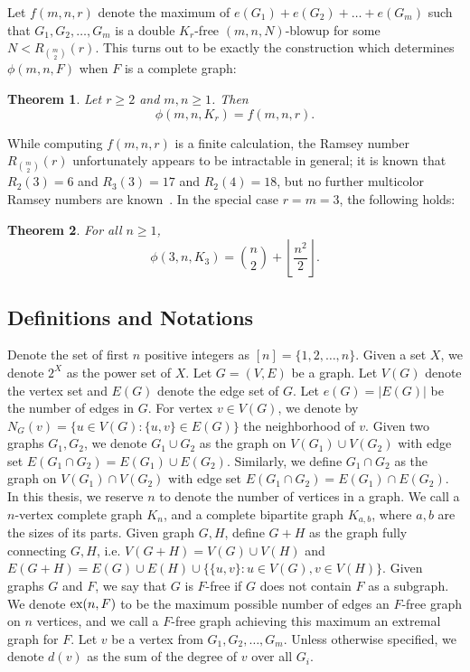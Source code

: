 \documentclass[12pt]{article}
\newtheorem{theorem}{Theorem}
\newcommand*{\ex}{\textnormal{ex}}
\begin{document}
Let $f(m, n, r)$ denote the maximum of $e(G_1) + e(G_2) + \dots + e(G_m)$ such that $G_1, G_2, \dots, G_m$ is a double $K_r$-free $(m, n, N)$-blowup for some $N < R_{\binom{m}{2}}(r)$. This turns out to be exactly the construction which determines $\phi(m, n, F)$ when $F$ is a complete graph: 

\begin{theorem}\label{thm:blowup}
Let $r \geq 2$ and $m,n \geq 1$. Then 
\[ 
  \phi(m, n, K_r) = f(m, n, r).
\]
\end{theorem}

While computing $f(m, n, r)$ is a finite calculation, the Ramsey number $R_{\binom{m}{2}}(r)$ unfortunately appears to be intractable in general; it is known that $R_2(3) = 6$ and $R_3(3) = 17$ and $R_2(4) = 18$, but no further multicolor Ramsey numbers are known~\cite{ConlonFerber2021,Lefmann1987}. In the special case $r = m = 3$, the following holds: 

\begin{theorem}\label{thm:triangles}
  For all $n \geq 1$,
  \[
    \phi(3, n, K_3) = \binom{n}{2} + \left\lfloor \frac{n^2}{2} \right\rfloor.
  \]
\end{theorem}

\subsection{Definitions and Notations}

Denote the set of first $n$ positive integers as $[n] = \{1, 2, \ldots, n\}$. Given a set $X$, we denote $2^X$ as the power set of $X$. Let $G = (V, E)$ be a graph. Let $V(G)$ denote the vertex set and $E(G)$ denote the edge set of $G$. Let $e(G) = |E(G)|$ be the number of edges in $G$. For vertex $v \in V(G)$, we denote by $N_G(v) = \{u \in V(G) : \{u, v\} \in E(G)\}$ the neighborhood of $v$. Given two graphs $G_1, G_2$, we denote $G_1 \cup G_2$ as the graph on $V(G_1) \cup V(G_2)$ with edge set $E(G_1 \cap G_2) = E(G_1) \cup E(G_2)$. Similarly, we define $G_1 \cap G_2$ as the graph on $V(G_1) \cap V(G_2)$ with edge set $E(G_1 \cap G_2) = E(G_1) \cap E(G_2)$. In this thesis, we reserve $n$ to denote the number of vertices in a graph. We call a $n$-vertex complete graph $K_n$, and a complete bipartite graph $K_{a, b}$, where $a, b$ are the sizes of its parts. Given graph $G, H$, define $G + H$ as the graph fully connecting $G, H$, i.e. $V(G + H) = V(G) \cup V(H)$ and $E(G + H) = E(G) \cup E(H) \cup \{\{u, v\} : u \in V(G), v \in V(H)\}$. Given graphs $G$ and $F$, we say that $G$ is $F$-free if $G$ does not contain $F$ as a subgraph. We denote $\ex(n, F)$ to be the maximum possible number of edges an $F$-free graph on $n$ vertices, and we call a $F$-free graph achieving this maximum an extremal graph for $F$. Let $v$ be a vertex from $G_1, G_2, \ldots, G_m$. Unless otherwise specified, we denote $d(v)$ as the sum of the degree of $v$ over all $G_i$.
\end{document}
